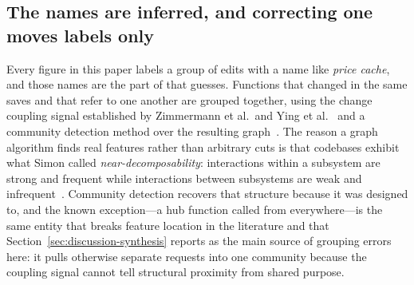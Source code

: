 \subsection{The names are inferred, and correcting one moves labels only}
\label{sec:names}

Every figure in this paper labels a group of edits with a name like
\emph{price cache}, and those names are the part of \sgt{} that guesses. Functions
that changed in the same saves and that refer to one another are grouped together,
using the change coupling signal established by Zimmermann et al.\ and Ying et
al.~\cite{zimmermann2004,ying2004} and a community detection method over the
resulting graph~\cite{traag2019}. The reason a graph algorithm finds real features
rather than arbitrary cuts is that codebases exhibit what Simon called
\emph{near-decomposability}: interactions within a subsystem are strong and frequent
while interactions between subsystems are weak and
infrequent~\cite{simon1962}. Community detection recovers that structure because
it was designed to, and the known exception---a hub function called from
everywhere---is the same entity that breaks feature location in the literature and
that Section~\ref{sec:discussion-synthesis} reports as the main source of
grouping errors here: it pulls otherwise separate requests into one community
because the coupling signal cannot tell structural proximity from shared purpose.

